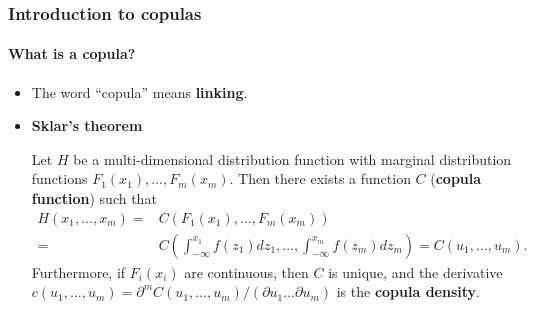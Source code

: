 \documentclass{beamer}
\begin{document}
\begin{frame}
  \frametitle{Introduction to copulas}
  \framesubtitle{What is a copula?}
  \begin{itemize}
  \item The word ``copula'' means \textbf{linking}.
  \item \textbf{Sklar's theorem}

    Let $H$ be a multi-dimensional distribution function with marginal
    distribution functions $F_1(x_1),...,F_m(x_m)$. Then there exists a
    function $C$ (\textbf{copula function}) such that
    \begin{equation*}
      \begin{split}
        H(x_1,...,x_m)= & C(F_1(x_1),...,F_m(x_m))\\
        =&C\left(\int_{-\infty}^{x_1}f(z_1)dz_1,...,\int_{-\infty}^{x_m}f(z_m)dz_m\right)=C(u_1,...,u_m).
      \end{split}
    \end{equation*}
    Furthermore, if $F_i(x_i)$ are continuous, then $C$ is unique, and the derivative $c(u_1,...,u_m)= \partial^m C(u_1,...,u_m)/(\partial u_1...
    \partial u_m)$ is the \textbf{copula density}.

  \end{itemize}
\end{frame}
\end{document}

